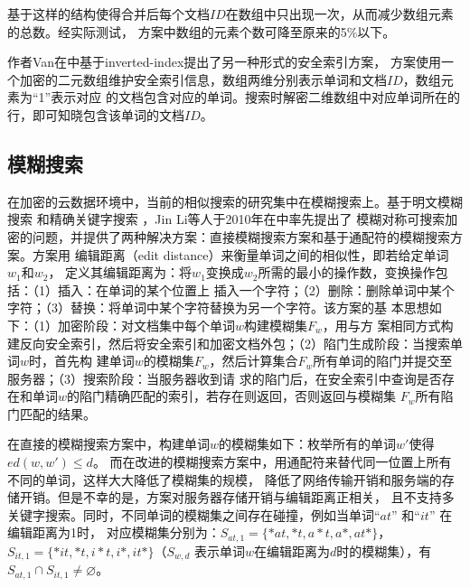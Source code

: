 基于这样的结构使得合并后每个文档$ID$在数组中只出现一次，从而减少数组元素的总数。经实际测试，
方案中数组的元素个数可降至原来的5\%以下。

作者Van在\cite{van2010computationally}中基于inverted-index提出了另一种形式的安全索引方案，
方案使用一个加密的二元数组维护安全索引信息，数组两维分别表示单词和文档$ID$，数组元素为“1”表示对应
的文档包含对应的单词。搜索时解密二维数组中对应单词所在的行，即可知晓包含该单词的文档$ID$。



\subsection{模糊搜索}
\label{sec:search_symm_symm_fuzzy}

在加密的云数据环境中，当前的相似搜索的研究集中在模糊搜索上。基于明文模糊搜索\cite{ji2009efficient}
\cite{li2008efficient} \cite{behm2009space} 和精确关键字搜索\cite{curtmola2006searchable}
\cite{chang2005privacy} \cite{jin2012reducing}，Jin Li等人于2010年在\cite{li2010fuzzy}中率先提出了
模糊对称可搜索加密的问题，并提供了两种解决方案：直接模糊搜索方案和基于通配符的模糊搜索方案。方案用
编辑距离（edit distance\cite{ristad1998learning}）来衡量单词之间的相似性，即若给定单词$w_1$和$w_2$，
定义其编辑距离为：将$w_1$变换成$w_2$所需的最小的操作数，变换操作包括：（1）插入：在单词的某个位置上
插入一个字符；（2）删除：删除单词中某个字符；（3）替换：将单词中某个字符替换为另一个字符。该方案的基
本思想如下：（1）加密阶段：对文档集中每个单词$w$构建模糊集$F_w$，用与\cite{curtmola2006searchable}方
案相同方式构建反向安全索引，然后将安全索引和加密文档外包；（2）陷门生成阶段：当搜索单词$w$时，首先构
建单词$w$的模糊集$F_w$，然后计算集合$F_w$所有单词的陷门并提交至服务器；（3）搜索阶段：当服务器收到请
求的陷门后，在安全索引中查询是否存在和单词$w$的陷门精确匹配的索引，若存在则返回，否则返回与模糊集
$F_w$所有陷门匹配的结果。

在直接的模糊搜索方案中，构建单词$w$的模糊集如下：枚举所有的单词$w'$使得$ed(w,w') \leq d$。
而在改进的模糊搜索方案中，用通配符来替代同一位置上所有不同的单词，这样大大降低了模糊集的规模，
降低了网络传输开销和服务端的存储开销。但是不幸的是，方案对服务器存储开销与编辑距离正相关，
且不支持多关键字搜索。同时，不同单词的模糊集之间存在碰撞，例如当单词$“at”$ 和$“it”$ 在编辑距离为1时，
对应模糊集分别为：$S_{at,1}=\{*at,*t,a*t,a*,at*\}$， $S_{it,1}= \{*it,*t,i*t,i*,it* \}$（$S_{w,d}$
表示单词$w$在编辑距离为$d$时的模糊集），有$S_{at,1} \cap  S_{it,1} \neq \varnothing $。

